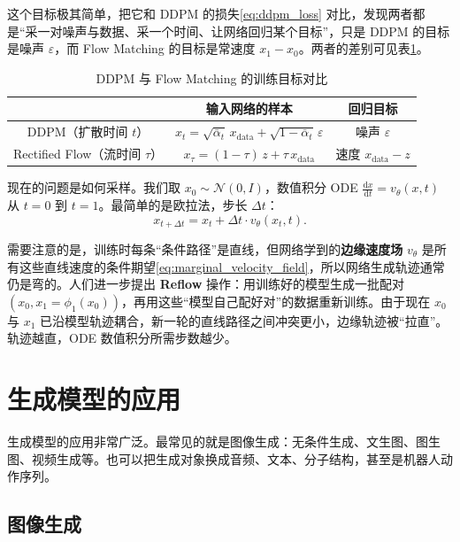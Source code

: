 这个目标极其简单，把它和 DDPM 的损失\eqref{eq:ddpm_loss} 对比，发现两者都是“采一对噪声与数据、采一个时间、让网络回归某个目标”，只是 DDPM 的目标是噪声 $\varepsilon$，而 Flow Matching 的目标是常速度 $x_1-x_0$。两者的差别可见表\cref{tab:ddpm_vs_flow_matching}。

\begin{table}
\centering
\begin{tabular}{c|c|c}
\toprule
 & 输入网络的样本 & 回归目标 \\
\midrule
DDPM（扩散时间 $t$） & $x_t=\sqrt{\bar\alpha_t}\,x_{\text{data}}+\sqrt{1-\bar\alpha_t}\,\varepsilon$ & 噪声 $\varepsilon$ \\
\midrule
Rectified Flow（流时间 $\tau$） & $x_\tau=(1-\tau)\,z+\tau\,x_{\text{data}}$ & 速度 $x_{\text{data}}-z$ \\
\bottomrule
\end{tabular}
\caption{DDPM 与 Flow Matching 的训练目标对比}
\label{tab:ddpm_vs_flow_matching}
\end{table}

现在的问题是如何采样。我们取 $x_0\sim\mathcal N(0,I)$，数值积分 ODE $\frac{\mathrm{d}x}{\mathrm{d}t}=v_\theta(x,t)$ 从 $t=0$ 到 $t=1$。最简单的是欧拉法，步长 $\Delta t$：
\begin{equation}
x_{t+\Delta t} = x_t + \Delta t\cdot v_\theta(x_t, t).
\end{equation}

需要注意的是，训练时每条“条件路径”是直线，但网络学到的\textbf{边缘速度场} $v_\theta$ 是所有这些直线速度的条件期望\eqref{eq:marginal_velocity_field}，所以网络生成轨迹通常仍是弯的。人们进一步提出 \textbf{Reflow} 操作\cite{liu2022flowstraightfastlearning}：用训练好的模型生成一批配对 $(x_0, x_1=\phi_1(x_0))$，再用这些“模型自己配好对”的数据重新训练。由于现在 $x_0$ 与 $x_1$ 已沿模型轨迹耦合，新一轮的直线路径之间冲突更小，边缘轨迹被“拉直”。轨迹越直，ODE 数值积分所需步数越少。

\section{生成模型的应用}

生成模型的应用非常广泛。最常见的就是图像生成：无条件生成、文生图、图生图、视频生成等。也可以把生成对象换成音频、文本、分子结构，甚至是机器人动作序列。

\subsection{图像生成}

